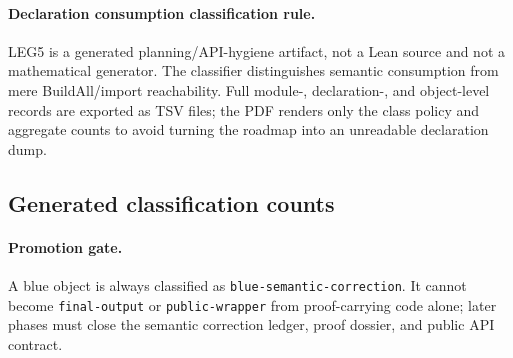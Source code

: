 \paragraph{Declaration consumption classification rule.} LEG5 is a generated planning/API-hygiene artifact, not a Lean source and not a mathematical generator. The classifier distinguishes semantic consumption from mere BuildAll/import reachability. Full module-, declaration-, and object-level records are exported as TSV files; the PDF renders only the class policy and aggregate counts to avoid turning the roadmap into an unreadable declaration dump.

\subsection*{Generated classification counts}

\paragraph{Promotion gate.} A blue object is always classified as \texttt{blue-semantic-correction}. It cannot become \texttt{final-output} or \texttt{public-wrapper} from proof-carrying code alone; later phases must close the semantic correction ledger, proof dossier, and public API contract.
